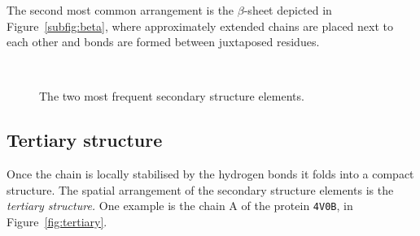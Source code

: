 The second most common arrangement is the $\beta$-sheet  \marginpar{$\beta$} depicted in Figure~\ref{subfig:beta}, where approximately extended chains are placed next to each other and bonds are formed between juxtaposed residues.


\begin{figure}[htbp]
	\centering
	\\
	\caption{The two most frequent secondary structure elements.}\label{fig:alpha_beta}
\end{figure}


\subsection{Tertiary structure}
Once the chain is locally stabilised by the hydrogen bonds it folds into a compact structure.
The spatial arrangement of the secondary structure elements is the \emph{tertiary structure.}
One example is the chain A of the protein \texttt{4V0B}, in Figure~\ref{fig:tertiary}.

